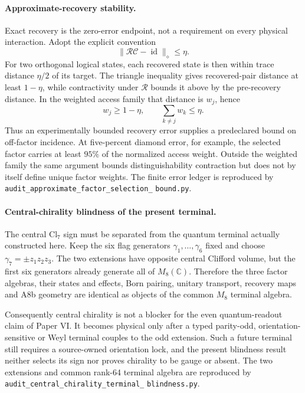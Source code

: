 \paragraph{Approximate-recovery stability.}
Exact recovery is the zero-error endpoint, not a requirement on every
physical interaction. Adopt the explicit convention
\begin{equation}
 \|\mathcal R\mathcal C-\operatorname{id}\|_\diamond\leq\eta.
 \label{eq:recoverydiamonderror}
\end{equation}
For two orthogonal logical states, each recovered state is then within trace
distance $\eta/2$ of its target. The triangle inequality gives recovered-pair
distance at least $1-\eta$, while contractivity under $\mathcal R$ bounds it
above by the pre-recovery distance. In the weighted access family that
distance is $w_j$, hence
\begin{equation}
 \boxed{
 w_j\geq1-\eta,
 \qquad
 \sum_{k\neq j}w_k\leq\eta.}
 \label{eq:approxfactorbound}
\end{equation}
Thus an experimentally bounded recovery error supplies a predeclared bound
on off-factor incidence. At five-percent diamond error, for example, the
selected factor carries at least $95\%$ of the normalized access weight.
Outside the weighted family the same argument bounds distinguishability
contraction but does not by itself define unique factor weights. The finite
error ledger is reproduced by
\texttt{audit\_approximate\_factor\_selection\_}\allowbreak
\texttt{bound.py}.

\paragraph{Central-chirality blindness of the present terminal.}
The central $\mathrm{Cl}_7$ sign must be separated from the quantum terminal
actually constructed here. Keep the six flag generators
$\gamma_1,\ldots,\gamma_6$ fixed and choose
$\gamma_7=\pm z_1z_2z_3$. The two extensions have opposite central Clifford
volume, but the first six generators already generate all of
$M_8(\mathbb C)$. Therefore the three factor algebras, their states and
effects, Born pairing, unitary transport, recovery maps and A8b geometry are
identical as objects of the common $M_8$ terminal algebra.

Consequently central chirality is not a blocker for the even quantum-readout
claim of Paper VI. It becomes physical only after a typed parity-odd,
orientation-sensitive or Weyl terminal couples to the odd extension. Such a
future terminal still requires a source-owned orientation lock, and the
present blindness result neither selects its sign nor proves chirality to be
gauge or absent. The two extensions and common rank-64 terminal algebra are
reproduced by
\texttt{audit\_central\_chirality\_terminal\_}\allowbreak
\texttt{blindness.py}.

